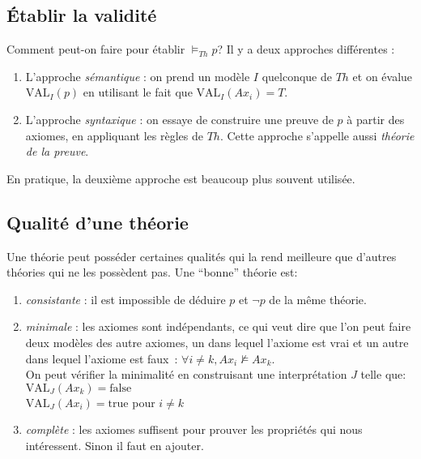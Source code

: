 {\subsection{Établir la validité}

Comment peut-on faire pour établir $\models_{Th} p$? Il y a deux approches différentes :
\begin{enumerate}
\item L'approche {\em sémantique} : on prend un modèle $I$ quelconque de $Th$ et on évalue $\textrm{VAL}_I (p)$
en utilisant le fait que $\text{VAL}_I (Ax_i)=T$.
\item L'approche {\em syntaxique} : on essaye de construire une preuve de $p$ à partir des axiomes, en appliquant les règles de $Th$.
Cette approche s'appelle aussi {\em théorie de la preuve}.\\
\end{enumerate}
En pratique, la deuxième approche est beaucoup plus souvent utilisée.\\

\subsection{Qualité d'une théorie}

Une théorie peut posséder certaines qualités qui la rend
meilleure que d'autres théories qui ne les possèdent pas.
Une ``bonne'' théorie est:
\begin {enumerate}
\item {\em consistante} : il est impossible de déduire \(p\) et \(\neg p\)  de la même théorie.
\item {\em minimale} : les axiomes sont indépendants, ce qui veut dire que l'on peut faire deux modèles des autre axiomes, un dans lequel l'axiome est vrai et un autre dans lequel l'axiome est faux~: $\forall i \neq k, Ax_i \not \models Ax_k $.\\
On peut vérifier la minimalité en construisant une interprétation $J$ telle que:\\
$\text{VAL}_J (Ax_k)= \mathrm{false}$\\
$\text{VAL}_J (Ax_i)= \mathrm{true}$ pour $i \neq k$
\item {\em complète} : les axiomes suffisent pour prouver les propriétés qui nous intéressent. Sinon il faut en ajouter.
\end {enumerate}

}
